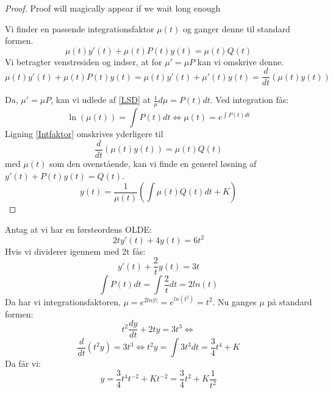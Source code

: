 \begin{proof}
Proof will magically appear if we wait long enough \hfill \break

Vi finder en passende integrationsfaktor $\mu(t)$ og ganger denne til standard formen.
\begin{equation}\label{Intfaktor}
\mu (t)y'(t) + \mu (t)P(t)y(t) = \mu (t)Q(t) 
\end{equation}
Vi betragter venstresiden og indser, at for $\mu ' = \mu P$ kan vi omskrive denne.
$$\mu (t)y'(t) + \mu (t)P(t)y(t) = \mu (t)y'(t) + \mu '(t)y(t) = \frac{d}{dt}(\mu (t)y(t))$$

Da, $\mu ' = \mu P$, kan vi udlede af \eqref{LSD} at $\frac{1}{\mu}d\mu = P(t)dt$. Ved integration fås: $$\ln(\mu (t))=\int P(t)dt\Leftrightarrow \mu (t) = e^{\int P(t)dt}$$ Ligning \eqref{Intfaktor} omskrives yderligere til $$\frac{d}{dt}(\mu (t)y(t)) = \mu (t)Q(t)$$ med $\mu (t)$ som den ovenstående, kan vi finde en generel løsning af $y'(t) + P(t)y(t) = Q(t)$.
\begin{equation}
y(t)=\frac{1}{\mu (t)}(\int \mu (t)Q(t)dt+K)
\end{equation}
\end{proof}

\begin{Example}
\textnormal{Antag at vi har en førsteordens OLDE:}
$$2ty'(t) + 4y(t) = 6t^2$$
\textnormal{Hvis vi dividerer igennem med 2t fås:}
$$y'(t) + \frac{2}{t}y(t) = 3t$$
$$\int P(t)dt = \int \frac{2}{t}dt = 2ln(t)$$
\textnormal{Da har vi integrationsfaktoren,} $\mu = e^{2ln|t|} = e^{ln(t^2)} = t^2$. \textnormal{Nu ganges $\mu$ på standard formen:}
$$t^2 \frac{dy}{dt} + 2ty = 3t^3\Leftrightarrow$$
$$\frac{d}{dt}(t^2y) = 3t^3 \Leftrightarrow  t^2y = \int 3t^3dt = \frac{3}{4}t^4 + K$$
\textnormal{Da får vi:} 
$$y = \frac{3}{4}t^4t^{-2} + Kt^{-2} = \frac{3}{4}t^2 + K \frac{1}{t^2}$$
\end{Example}


